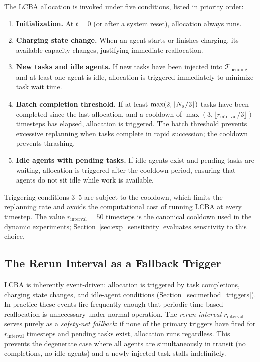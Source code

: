 The LCBA allocation is invoked under five conditions, listed in priority order:

\begin{enumerate}
  \item \textbf{Initialization.} At $t = 0$ (or after a system reset),
        allocation always runs.
  \item \textbf{Charging state change.} When an agent starts or finishes
        charging, its available capacity changes, justifying immediate
        reallocation.
  \item \textbf{New tasks and idle agents.} If new tasks have been injected
        into $\mathcal{T}_{\text{pending}}$ and at least one agent is idle,
        allocation is triggered immediately to minimize task wait time.
  \item \textbf{Batch completion threshold.} If at least
        $\max(2, \lfloor N_a/3 \rfloor)$ tasks have been completed since
        the last allocation, and a cooldown of
        $\max(3, \lfloor r_{\text{interval}}/3 \rfloor)$ timesteps has
        elapsed, allocation is triggered.
        The batch threshold prevents excessive replanning when tasks complete
        in rapid succession; the cooldown prevents thrashing.
  \item \textbf{Idle agents with pending tasks.}
        If idle agents exist and pending tasks are waiting, allocation is
        triggered after the cooldown period, ensuring that agents do not sit
        idle while work is available.
\end{enumerate}

Triggering conditions 3--5 are subject to the cooldown, which limits the
replanning rate and avoids the computational cost of running LCBA at every
timestep.
The value $r_{\text{interval}} = 50$ timesteps is the canonical cooldown used
in the dynamic experiments; Section~\ref{sec:exp_sensitivity} evaluates
sensitivity to this choice.


\subsection{The Rerun Interval as a Fallback Trigger}
\label{subsec:method_rerun_interval}

LCBA is inherently event-driven: allocation is triggered by task completions,
charging state changes, and idle-agent conditions
(Section~\ref{sec:method_triggers}).
In practice these events fire frequently enough that periodic time-based
reallocation is unnecessary under normal operation.
The \emph{rerun interval} $r_{\text{interval}}$ serves purely as a
\emph{safety-net fallback}: if none of the primary triggers have fired for
$r_{\text{interval}}$ timesteps and pending tasks exist, allocation runs
regardless.
This prevents the degenerate case where all agents are simultaneously in
transit (no completions, no idle agents) and a newly injected task stalls
indefinitely.

